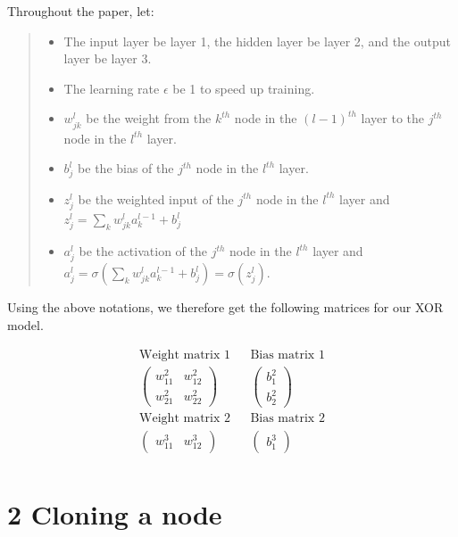 \documentclass[12pt,english,]{article}
\newcommand{\mtx}[1]{\begin{pmatrix}#1\end{pmatrix}} %
\begin{document}
Throughout the paper, let:

\vspace{-2truemm}

\begin{quote}
\begin{itemize}
\item The input layer be layer 1, the hidden layer be layer 2, and the output layer be layer 3.
\item The learning rate $\epsilon$ be 1 to speed up training.
\item $w_{jk}^{l}$ be the weight from the $k^{th}$ node in the $(l-1)^{th}$ layer to the $j^{th}$ node in the $l^{th}$ layer.
\item $b_{j}^l$ be the bias of the $j^{th}$ node in the $l^{th}$ layer.
\item $z_{j}^l$ be the weighted input of the $j^{th}$ node in the $l^{th}$ layer and\\ $z_{j}^{l} =\sum_{k}w_{jk}^{l}a_{k}^{l-1} + b_{j}^l$
\item $a_{j}^l$ be the activation of the $j^{th}$ node in the $l^{th}$ layer and\\ $a_{j}^{l} =\sigma(\sum_{k}w_{jk}^{l}a_{k}^{l-1} + b_{j}^l)= \sigma(z_{j}^{l})$.
\end{itemize}
\end{quote}

\vspace{-2truemm}

\newpage

Using the above notations, we therefore get the following matrices for our XOR model.

\begin{align*}
\text{Weight matrix 1} &&\text{Bias matrix 1} \\
\mtx{w_{11}^2 & w_{12}^2\\  w_{21}^2 & w_{22}^2} &&\mtx{b_{1}^2 \\ b_{2}^2 }\\
\text{Weight matrix 2} &&\text{Bias matrix 2}\\
\mtx{w_{11}^3 & w_{12}^3} &&\mtx{b_{1}^3}\\
\end{align*}

\hypertarget{section2}{%
\section{\texorpdfstring{2 \enspace Cloning a node}{2 Cloning a node}}\label{section2}}
\end{document}
